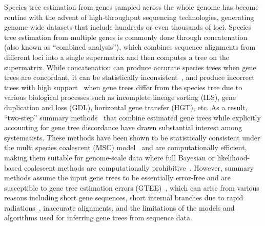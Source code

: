 \documentclass[10pt,a4paper]{article}
\begin{document}
Species tree estimation from genes sampled across the whole genome has become routine with the advent of high-throughput sequencing technologies, generating genome-wide datasets that include hundreds or even thousands of loci. Species tree estimation from multiple genes is commonly done through concatenation (also known as ``combined analysis''), which combines sequence alignments from different loci into a single supermatrix and then computes a tree on the supermatrix. While concatenation can produce accurate species trees when gene trees are concordant, it can be statistically inconsistent~\cite{roch2015likelihood,consensus-inconsistent}, and produce incorrect trees with high support~\cite{kubatko-degnan-2007} when gene trees differ from the species tree due to various biological processes such as incomplete lineage sorting (ILS), gene duplication and loss (GDL), horizontal gene transfer (HGT), etc. As a result, ``two-step'' summary methods~\cite{mpest,astral,larget-bioinf2010,glass,stem,svdquartet,steac,njst,wqfm,astrid,stelar} that combine estimated gene trees while explicitly accounting for gene tree discordance have drawn substantial interest among systematists. These methods have been shown to be statistically consistent under the multi species coalescent (MSC) model~\cite{kingman} and are computationally efficient, making them suitable for genome-scale data where full Bayesian or likelihood-based coalescent methods are computationally prohibitive~\cite{bayzid2013naive,liu2009coalescent}. However, summary methods assume the input gene trees to be essentially error-free and are susceptible to gene tree estimation errors (GTEE)~\cite{bayzid2013naive,lanier2014low,roch2015likelihood,blom2017accounting,xi2015genes}, which can arise from various reasons including short gene sequences,  short internal branches due to rapid radiations~\cite{xi2015genetreeerror,cai2021perfectstorm}, inaccurate alignments, and the limitations of the models and algorithms used for inferring gene trees from sequence data. 



\end{document}
